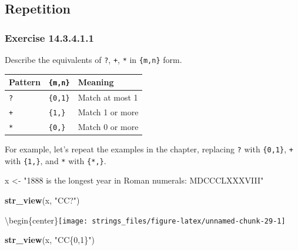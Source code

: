 \documentclass[]{book}
\newenvironment{Shaded}{\begin{snugshade}}{\end{snugshade}}
\newcommand{\KeywordTok}[1]{\textcolor[rgb]{0.13,0.29,0.53}{\textbf{#1}}}
\newcommand{\NormalTok}[1]{#1}
\newcommand{\StringTok}[1]{\textcolor[rgb]{0.31,0.60,0.02}{#1}}
\theoremstyle{plain}
\theoremstyle{remark}
\begin{document}
\hypertarget{repetition}{%
\subsection{Repetition}\label{repetition}}

\hypertarget{exercise-14.3.4.1.1}{%
\subsubsection*{\texorpdfstring{Exercise {14.3.4.1.1}}{Exercise 14.3.4.1.1}}\label{exercise-14.3.4.1.1}}

Describe the equivalents of \texttt{?}, \texttt{+}, \texttt{*} in \texttt{\{m,n\}} form.

\begin{longtable}[]{@{}lll@{}}
\toprule
Pattern & \texttt{\{m,n\}} & Meaning\tabularnewline
\midrule
\endhead
\texttt{?} & \texttt{\{0,1\}} & Match at most 1\tabularnewline
\texttt{+} & \texttt{\{1,\}} & Match 1 or more\tabularnewline
\texttt{*} & \texttt{\{0,\}} & Match 0 or more\tabularnewline
\bottomrule
\end{longtable}

For example, let's repeat the examples in the chapter, replacing \texttt{?} with \texttt{\{0,1\}},
\texttt{+} with \texttt{\{1,\}}, and \texttt{*} with \texttt{\{*,\}}.

\begin{Shaded}
\begin{Highlighting}[]
\NormalTok{x <-}\StringTok{ "1888 is the longest year in Roman numerals: MDCCCLXXXVIII"}
\end{Highlighting}
\end{Shaded}

\begin{Shaded}
\begin{Highlighting}[]
\KeywordTok{str_view}\NormalTok{(x, }\StringTok{"CC?"}\NormalTok{)}
\end{Highlighting}
\end{Shaded}

\textbackslash{}begin\{center\}\texttt{[image: strings\_files/figure-latex/unnamed-chunk-29-1]}

\begin{Shaded}
\begin{Highlighting}[]
\KeywordTok{str_view}\NormalTok{(x, }\StringTok{"CC\{0,1\}"}\NormalTok{)}
\end{Highlighting}
\end{Shaded}
\end{document}
